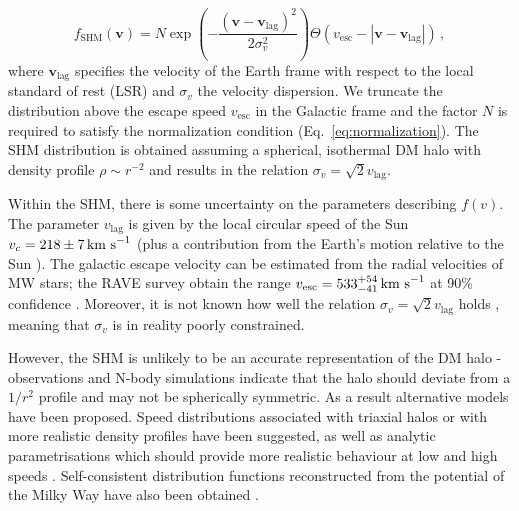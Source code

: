 \begin{equation}
\label{eq:gaussian}
f_{\textrm{SHM}}(\textbf{v}) = N \exp\left(-\frac{(\textbf{v} - \textbf{v}_\textrm{lag})^2}{2\sigma_v^2}\right) \Theta(v_\textrm{esc} - |\textbf{v} - \textbf{v}_\textrm{lag}|)\,,
\end{equation}
where $\textbf{v}_\textrm{lag}$ specifies the velocity of the Earth frame with respect to the local standard of rest (LSR) and $\sigma_v$ the velocity dispersion. We truncate the distribution above the escape speed $v_\textrm{esc}$ in the Galactic frame and the factor $N$ is required to satisfy the normalization condition (Eq.~\ref{eq:normalization}).  The SHM distribution is obtained assuming a spherical, isothermal DM halo with density profile $\rho \sim r^{-2}$ and results in the relation $\sigma_v = \sqrt{2} v_\textrm{lag}$. 

Within the SHM, there is some uncertainty on the parameters describing $f(v)$. The parameter $v_\textrm{lag}$ is given by the local circular speed of the Sun $v_c = 218 \pm 7 \,\textrm{km s}^{-1}$ \cite{Kerr:1986,Feast:1997} (plus a contribution from the Earth's motion relative to the Sun ). The galactic escape velocity can be estimated from the radial velocities of MW stars; the RAVE survey obtain the range $v_\textrm{esc} = 533_{-41}^{+54} \,\textrm{km s}^{-1}$ at 90\% confidence \cite{RAVE:2007, RAVE:2014}.  Moreover, it is not known how well the relation $\sigma_v = \sqrt{2} v_\textrm{lag}$ holds , meaning that $\sigma_v$ is in reality poorly constrained. 

However, the SHM is unlikely to be an accurate representation of the DM halo - observations and N-body simulations indicate that the halo should deviate from a $1/r^2$ profile and may not be spherically symmetric. As a result alternative models have been proposed. Speed distributions associated with triaxial halos \cite{Evans:2000} or with more realistic density profiles \cite{Widrow:2000} have been suggested, as well as analytic parametrisations which should provide more realistic behaviour at low and high speeds \cite{Lisanti:2010}.  Self-consistent distribution functions reconstructed from the potential of the Milky Way have also been obtained \cite{Bhattacharjee:2012,Fornasa:2013}.

